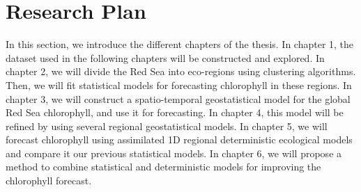 \chapter{Research Plan}

In this section, we introduce the different chapters of the thesis.  In chapter
1, the dataset used in the following chapters will be constructed and explored.
In chapter 2, we will divide the Red Sea into eco-regions using clustering
algorithms. Then, we will fit statistical models for forecasting chlorophyll in
these regions. In chapter 3, we will construct a spatio-temporal geostatistical
model for the global Red Sea chlorophyll, and use it for forecasting. In
chapter 4, this model will be refined by using several regional geostatistical
models. In chapter 5, we will forecast chlorophyll using assimilated 1D
regional deterministic ecological models and compare it our previous statistical
models.  In chapter 6, we will propose a method to combine statistical and
deterministic models for improving the chlorophyll forecast.
